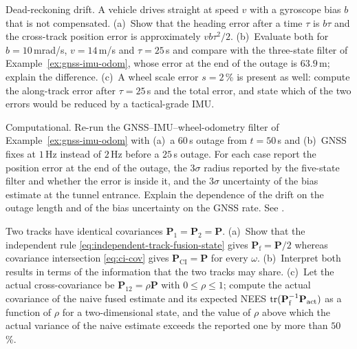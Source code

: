 \begin{prob}\label{prob:ch05:3}
Dead-reckoning drift. A vehicle drives straight at speed $v$ with a gyroscope bias $b$ that is not compensated. (a)~Show that the heading error after a time $\tau$ is $b\tau$ and the cross-track position error is approximately $vb\tau^{2}/2$. (b)~Evaluate both for $b=10$\,mrad/s, $v=14$\,m/s and $\tau=25$\,s and compare with the three-state filter of Example~\ref{ex:gnss-imu-odom}, whose error at the end of the outage is $63.9$\,m; explain the difference. (c)~A wheel scale error $s=2$\,\% is present as well: compute the along-track error after $\tau=25$\,s and the total error, and state which of the two errors would be reduced by a tactical-grade IMU.
\end{prob}

\begin{prob}\label{prob:ch05:4}
Computational. Re-run the GNSS--IMU--wheel-odometry filter of Example~\ref{ex:gnss-imu-odom} with (a)~a $60$\,s outage from $t=50$\,s and (b)~GNSS fixes at $1$\,Hz instead of $2$\,Hz before a $25$\,s outage. For each case report the position error at the end of the outage, the $3\sigma$ radius reported by the five-state filter and whether the error is inside it, and the $3\sigma$ uncertainty of the bias estimate at the tunnel entrance. Explain the dependence of the drift on the outage length and of the bias uncertainty on the GNSS rate. See .
\end{prob}

\begin{prob}\label{prob:ch05:5}
Two tracks have identical covariances $\mathbf{P}_{1}=\mathbf{P}_{2}=\mathbf{P}$. (a)~Show that the independent rule \eqref{eq:independent-track-fusion-state} gives $\mathbf{P}_{\mathrm{f}}=\mathbf{P}/2$ whereas covariance intersection \eqref{eq:ci-cov} gives $\mathbf{P}_{\mathrm{CI}}=\mathbf{P}$ for every $\omega$. (b)~Interpret both results in terms of the information that the two tracks may share. (c)~Let the actual cross-covariance be $\mathbf{P}_{12}=\rho\mathbf{P}$ with $0\le\rho\le1$; compute the actual covariance of the naive fused estimate and its expected NEES $\operatorname{tr}(\mathbf{P}_{\mathrm{f}}^{-1}\mathbf{P}_{\mathrm{act}})$ as a function of $\rho$ for a two-dimensional state, and the value of $\rho$ above which the actual variance of the naive estimate exceeds the reported one by more than $50$\,\%.
\end{prob}


